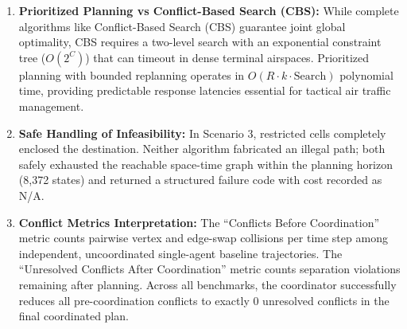 \documentclass[11pt,a4paper]{article}
\begin{document}
\begin{enumerate}
    \item \textbf{Prioritized Planning vs Conflict-Based Search (CBS):} While complete algorithms like Conflict-Based Search (CBS) \cite{sharon2015} guarantee joint global optimality, CBS requires a two-level search with an exponential constraint tree ($O(2^C)$) that can timeout in dense terminal airspaces. Prioritized planning with bounded replanning operates in $O(R \cdot k \cdot \text{Search})$ polynomial time, providing predictable response latencies essential for tactical air traffic management.
    \item \textbf{Safe Handling of Infeasibility:} In Scenario 3, restricted cells completely enclosed the destination. Neither algorithm fabricated an illegal path; both safely exhausted the reachable space-time graph within the planning horizon (8,372 states) and returned a structured failure code with cost recorded as N/A.
    \item \textbf{Conflict Metrics Interpretation:} The ``Conflicts Before Coordination'' metric counts pairwise vertex and edge-swap collisions per time step among independent, uncoordinated single-agent baseline trajectories. The ``Unresolved Conflicts After Coordination'' metric counts separation violations remaining after planning. Across all benchmarks, the coordinator successfully reduces all pre-coordination conflicts to exactly 0 unresolved conflicts in the final coordinated plan.
\end{enumerate}
\end{document}
